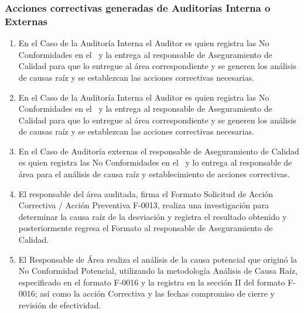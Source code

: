 \subsubsection{Acciones correctivas generadas de Auditorias Interna o Externas}
\begin{enumerate}
	\item En el Caso de la Auditoría Interna el Auditor es quien registra las No Conformidades en el \RAC~y la entrega al responsable de Aseguramiento de Calidad para que lo entregue al área correspondiente y se generen los análisis de causas raíz y se establezcan las acciones correctivas necesarias.
	\item En el Caso de la Auditoría Interna el Auditor es quien registra las No Conformidades en el \RAC~y la entrega al responsable de Aseguramiento de Calidad para que lo entregue al área correspondiente y se generen los análisis de causas raíz y se establezcan las acciones correctivas necesarias.
	\item En el Caso de Auditoría externas el responsable de Aseguramiento de Calidad es quien registra las No Conformidades en el \RAC~y lo entrega al responsable de área para el análisis de causa raíz y establecimiento de acciones correctivas.
	\item El responsable del área auditada, firma el Formato Solicitud de Acción Correctiva / Acción Preventiva F-0013, realiza una investigación para determinar la causa raíz de la desviación y registra el resultado obtenido y posteriormente regresa el Formato al responsable de Aseguramiento de Calidad.
	\item El Responsable de Área realiza el análisis de la causa potencial que originó la No Conformidad Potencial, utilizando la metodología Análisis de Causa Raíz, especificado en el formato F-0016 y la registra en la sección II del formato F-0016; así como la acción Correctiva y las fechas compromiso de cierre y revisión de efectividad.
\end{enumerate}

